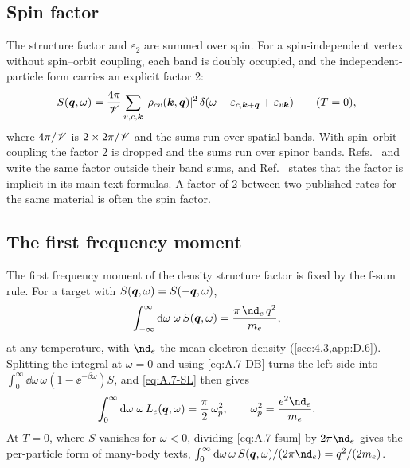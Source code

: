 \subsection{Spin factor}

The structure factor and $\varepsilon_2$ are summed over spin. For a spin-independent vertex without spin--orbit coupling, each band is doubly occupied, and the independent-particle form carries an explicit factor 2:
\begin{equation}
  S(\bm{q},\omega) = \frac{4\pi}{\mathscr{V}}\sum_{v,c,\bm{k}}|\rho_{cv}(\bm{k},\bm{q})|^2\,\delta(\omega - \varepsilon_{c,\bm{k}+\bm{q}} + \varepsilon_{v\bm{k}}) \qquad (T = 0),
  \label{eq:A.7-spin}
\end{equation}
where $4\pi/\mathscr{V}$ is $2\times 2\pi/\mathscr{V}$ and the sums run over spatial bands. With spin--orbit coupling the factor 2 is dropped and the sums run over spinor bands. Refs.~\cite[Eq.~(A.29)]{essig2016direct} and~\cite[Eq.~(6)]{catena2021crystal} write the same factor outside their band sums, and Ref.~\cite[Appendix~B, above Eq.~(B7)]{knapen2021dark} states that the factor is implicit in its main-text formulas. A factor of 2 between two published rates for the same material is often the spin factor.

\subsection{The first frequency moment}

The first frequency moment of the density structure factor is fixed by the f-sum rule. For a target with $S(\bm{q},\omega) = S(-\bm{q},\omega)$,
\begin{equation}
  \int_{-\infty}^{\infty}\dd\omega\;\omega\,S(\vect{q},\omega) = \frac{\pi\,\nd_e\,q^2}{m_e} ,
  \label{eq:A.7-fsum}
\end{equation}
at any temperature, with $\nd_e$ the mean electron density (\cref{sec:4.3,app:D.6}). Splitting the integral at $\omega = 0$ and using \cref{eq:A.7-DB} turns the left side into $\int_0^\infty\dd\omega\,\omega(1 - \ee^{-\beta\omega})S$, and \cref{eq:A.7-SL} then gives~\cite[Eq.~(S.10)]{hochberg2021determining}
\begin{equation}
  \int_0^\infty\dd\omega\;\omega\,L_e(\vect{q},\omega) = \frac{\pi}{2}\,\omega_p^2, \qquad \omega_p^2 = \frac{e^2\nd_e}{m_e}.
  \label{eq:A.7-fsumL}
\end{equation}
At $T = 0$, where $S$ vanishes for $\omega < 0$, dividing \cref{eq:A.7-fsum} by $2\pi\nd_e$ gives the per-particle form of many-body texts, $\int_0^\infty\dd\omega\,\omega\,S(\vect{q},\omega)/(2\pi\nd_e) = q^2/(2m_e)$.

